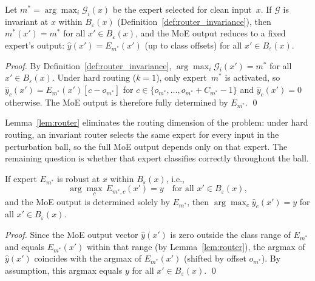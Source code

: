 \documentclass[runningheads]{llncs}
\begin{document}
\begin{lemma}
\label{lem:router}
Let $m^* = \arg\max_i \mathcal{G}_i(x)$ be the expert selected for clean input~$x$. If $\mathcal{G}$ is invariant at $x$ within $B_\varepsilon(x)$ (Definition~\ref{def:router_invariance}), then $m^*(x') = m^*$ for all $x' \in B_\varepsilon(x)$, and the MoE output reduces to a fixed expert's output: $\hat{y}(x') = E_{m^*}(x')$ (up to class offsets) for all $x' \in B_\varepsilon(x)$.
\end{lemma}

\begin{proof}
By Definition~\ref{def:router_invariance}, $\arg\max_i \mathcal{G}_i(x') = m^*$ for all $x' \in B_\varepsilon(x)$. Under hard routing ($k{=}1$), only expert~$m^*$ is activated, so $\hat{y}_c(x') = E_{m^*}(x')[c - o_{m^*}]$ for $c \in \{o_{m^*}, \ldots, o_{m^*} + C_{m^*} - 1\}$ and $\hat{y}_c(x') = 0$ otherwise. The MoE output is therefore fully determined by $E_{m^*}$. \qed
\end{proof}

Lemma~\ref{lem:router} eliminates the routing dimension of the problem: under hard routing, an invariant router selects the same expert for every input in the perturbation ball, so the full MoE output depends only on that expert. The remaining question is whether that expert classifies correctly throughout the ball.

\begin{lemma}
\label{lem:expert}
If expert $E_{m^*}$ is robust at $x$ within $B_\varepsilon(x)$, i.e.,
\[
    \arg\max_c\, E_{m^*,c}(x') = y \quad \text{for all } x' \in B_\varepsilon(x),
\]
and the MoE output is determined solely by $E_{m^*}$, then $\arg\max_c \hat{y}_c(x') = y$ for all $x' \in B_\varepsilon(x)$.
\end{lemma}

\begin{proof}
Since the MoE output vector $\hat{y}(x')$ is zero outside the class range of $E_{m^*}$ and equals $E_{m^*}(x')$ within that range (by Lemma~\ref{lem:router}), the argmax of $\hat{y}(x')$ coincides with the argmax of $E_{m^*}(x')$ (shifted by offset $o_{m^*}$). By assumption, this argmax equals $y$ for all $x' \in B_\varepsilon(x)$. \qed
\end{proof}

\end{document}
